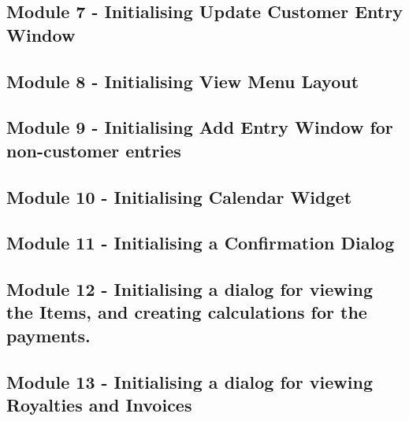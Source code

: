 \begin{landscape}
\begin{scriptsize}
\subsection{Module 7 - Initialising Update Customer Entry Window}

 \label{ssec:UpdateEntryWindow.py}

\subsection{Module 8 - Initialising View Menu Layout}

 \label{ssec:ViewWindow.py}

\subsection{Module 9 - Initialising Add Entry Window for non-customer entries}


\subsection{Module 10 - Initialising Calendar Widget}

 \label{ssec:CalendarWidget.py}

\subsection{Module 11 - Initialising a Confirmation Dialog}


\subsection{Module 12 - Initialising a dialog for viewing the Items, and creating calculations for the payments.}

 \label{ssec:Items.py}

\subsection{Module 13 - Initialising a dialog for viewing Royalties and Invoices}


\end{scriptsize}
\end{landscape}
